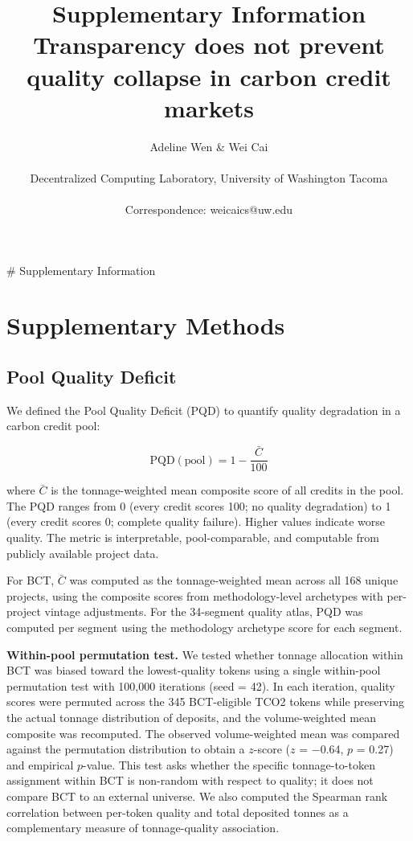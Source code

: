 \documentclass[11pt]{article}
\title{Supplementary Information\\[0.5em]\large Transparency does not prevent quality collapse in carbon credit markets}
\author{Adeline Wen \& Wei Cai\\\\
\small Decentralized Computing Laboratory, University of Washington Tacoma\\\\
\small Correspondence: weicaics@uw.edu}
\date{}
\begin{document}
\maketitle

# Supplementary Information



\section*{Supplementary Methods}

\subsection*{Pool Quality Deficit}

We defined the Pool Quality Deficit (PQD) to quantify quality degradation in a carbon credit pool:

$$\text{PQD}(\text{pool}) = 1 - \frac{\bar{C}}{100}$$

where $\bar{C}$ is the tonnage-weighted mean composite score of all credits in the pool. The PQD ranges from 0 (every credit scores 100; no quality degradation) to 1 (every credit scores 0; complete quality failure). Higher values indicate worse quality. The metric is interpretable, pool-comparable, and computable from publicly available project data.

For BCT, $\bar{C}$ was computed as the tonnage-weighted mean across all 168 unique projects, using the composite scores from methodology-level archetypes with per-project vintage adjustments. For the 34-segment quality atlas, PQD was computed per segment using the methodology archetype score for each segment.

\textbf{Within-pool permutation test.} We tested whether tonnage allocation within BCT was biased toward the lowest-quality tokens using a single within-pool permutation test with 100,000 iterations (seed = 42). In each iteration, quality scores were permuted across the 345 BCT-eligible TCO2 tokens while preserving the actual tonnage distribution of deposits, and the volume-weighted mean composite was recomputed. The observed volume-weighted mean was compared against the permutation distribution to obtain a $z$-score ($z$ = $-$0.64, $p$ = 0.27) and empirical $p$-value. This test asks whether the specific tonnage-to-token assignment within BCT is non-random with respect to quality; it does not compare BCT to an external universe. We also computed the Spearman rank correlation between per-token quality and total deposited tonnes as a complementary measure of tonnage-quality association.
\end{document}

